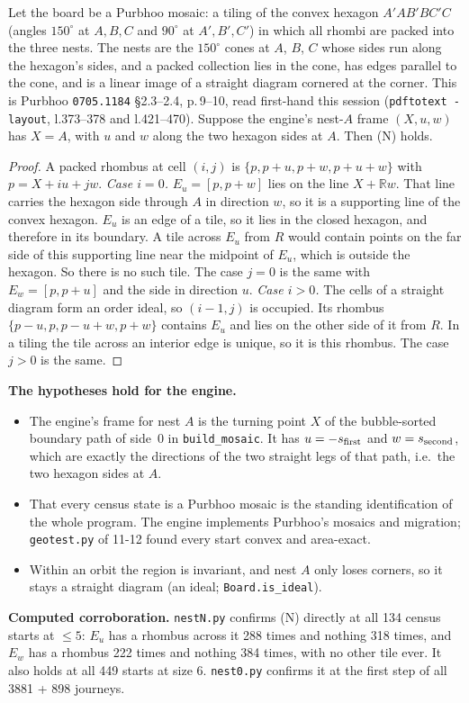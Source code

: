\documentclass[11pt]{article}
\theoremstyle{definition}\newtheorem{definition}[theorem]{Definition}\newtheorem{remark}[theorem]{Remark}
\begin{document}
\begin{lemma}\label{lem:N}
Let the board be a Purbhoo mosaic: a tiling of the convex hexagon $A'AB'BC'C$ (angles $150^\circ$ at $A,B,C$ and $90^\circ$ at $A',B',C'$) in which all rhombi are packed into the three nests. The nests are the $150^\circ$ cones at $A$, $B$, $C$ whose sides run along the hexagon's sides, and a packed collection lies in the cone, has edges parallel to the cone, and is a linear image of a straight diagram cornered at the corner.
This is Purbhoo \texttt{0705.1184} \S2.3--2.4, p.\,9--10, read first-hand this session (\texttt{pdftotext -layout}, l.373--378 and l.421--470).
Suppose the engine's nest-$A$ frame $(X,u,w)$ has $X=A$, with $u$ and $w$ along the two hexagon sides at $A$. Then (N) holds.
\end{lemma}
\begin{proof}
A packed rhombus at cell $(i,j)$ is $\{p,p+u,p+w,p+u+w\}$ with $p=X+iu+jw$.
\emph{Case $i=0$.} $E_u=[p,p+w]$ lies on the line $X+\mathbb Rw$. That line carries the hexagon side through $A$ in direction $w$, so it is a supporting line of the convex hexagon. $E_u$ is an edge of a tile, so it lies in the closed hexagon, and therefore in its boundary.
A tile across $E_u$ from $R$ would contain points on the far side of this supporting line near the midpoint of $E_u$, which is outside the hexagon. So there is no such tile. The case $j=0$ is the same with $E_w=[p,p+u]$ and the side in direction $u$.
\emph{Case $i>0$.} The cells of a straight diagram form an order ideal, so $(i-1,j)$ is occupied. Its rhombus $\{p-u,p,p-u+w,p+w\}$ contains $E_u$ and lies on the other side of it from $R$. In a tiling the tile across an interior edge is unique, so it is this rhombus. The case $j>0$ is the same.
\end{proof}

\noindent\textbf{The hypotheses hold for the engine.}
\begin{itemize}
\item The engine's frame for nest $A$ is the turning point $X$ of the bubble-sorted boundary path of side~0 in \texttt{build\_mosaic}. It has $u=-s_{\rm first}$ and $w=s_{\rm second}$, which are exactly the directions of the two straight legs of that path, i.e.\ the two hexagon sides at $A$.
\item That every census state is a Purbhoo mosaic is the standing identification of the whole program. The engine implements Purbhoo's mosaics and migration; \texttt{geotest.py} of 11-12 found every start convex and area-exact.
\item Within an orbit the region is invariant, and nest $A$ only loses corners, so it stays a straight diagram (an ideal; \texttt{Board.is\_ideal}).
\end{itemize}
\textbf{Computed corroboration.} \texttt{nestN.py} confirms (N) directly at all 134 census starts at $\le5$: $E_u$ has a rhombus across it 288 times and nothing 318 times, and $E_w$ has a rhombus 222 times and nothing 384 times, with no other tile ever. It also holds at all 449 starts at size 6. \texttt{nest0.py} confirms it at the first step of all 3881 + 898 journeys.
\end{document}
